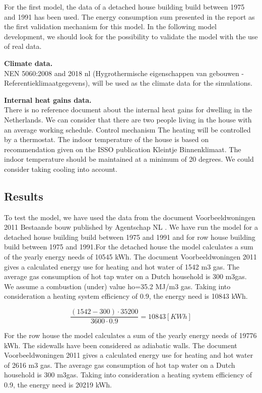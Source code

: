 For the first model, the data of a detached house building build between 1975 and 1991 has been used. 
The energy consumption sum presented in the report as the first validation mechanism for this model. In the following model development, we should look for the possibility to validate the model with the use of real data.

\textbf{Climate data.}\\
NEN 5060:2008 and 2018 nl (Hygrothermische eigenschappen van gebouwen -Referentieklimaatgegevens), will be used as the climate data for the simulations.

\textbf{Internal heat gains data.}\\
There is no reference document about the internal heat gains for dwelling in the Netherlands. We can consider that there are two people living in the house with an average working schedule.
Control mechanism
The heating will be controlled by a thermostat. The indoor temperature of the house is based on recommendation given on the ISSO publication Kleintje Binnenklimaat. The indoor temperature should be maintained at a minimum of 20 degrees. 
We could consider taking cooling into account. 


\subsection{Results}
To test the model, we have used the data from the document Voorbeeldwoningen 2011 Bestaande bouw published by Agentschap NL \cite{VOORBEELD}. We have run the model for a detached house building build between 1975 and 1991 and for row house building build between 1975 and 1991.For the detached house the model calculates a sum of the yearly energy needs of 10545 kWh. The document Voorbeeldwoningen 2011 gives a calculated energy use for heating and hot water of 1542 m3 gas. The average gas consumption of hot tap water on a Dutch household is 300 m3gas. We assume a combustion (under) value ho=35.2 MJ/m3 gas. Taking into consideration a heating system efficiency of 0.9, the energy need is 10843 kWh. 


\begin{equation}
\frac{(1542-300) \cdot 35200}{3600\cdot 0.9}= 10843[KWh] 
\end{equation}


For the row house the model calculates a sum of the yearly energy needs of 19776 kWh. The sidewalls have been considered as adiabatic walls. The document Voorbeeldwoningen 2011 gives a calculated energy use for heating and hot water of 2616 m3 gas. The average gas consumption of hot tap water on a Dutch household is 300 m3gas. Taking into consideration a heating system efficiency of 0.9, the energy need is 20219 kWh. 

